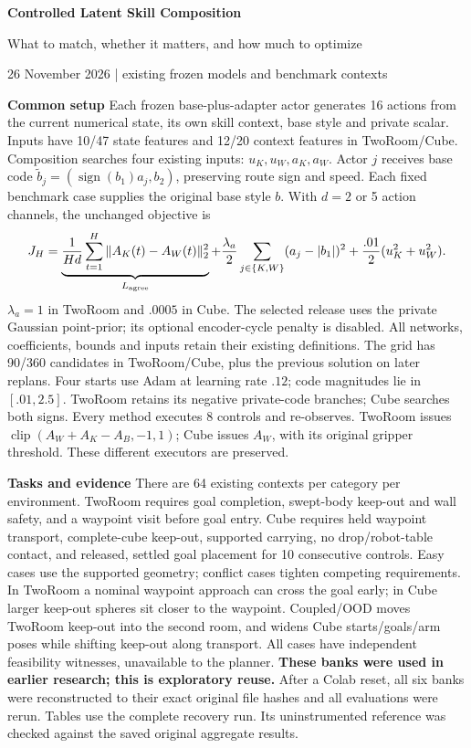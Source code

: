 \documentclass[11pt,a4paper]{article}
\newcommand{\topic}[1]{\par\smallskip\textbf{#1}\quad}
\begin{document}
\fontsize{10}{12}\selectfont
\begin{center}{\LARGE\bfseries\color{ink}Controlled Latent Skill Composition\par}
{\large What to match, whether it matters, and how much to optimize\par}
{\small 26 November 2026 | existing frozen models and benchmark contexts}\end{center}

\topic{Common setup}
Each frozen base-plus-adapter actor generates 16 actions from the current numerical
state, its own skill context, base style and private scalar. Inputs have 10/47
state features and 12/20 context features in TwoRoom/Cube. Composition searches
four existing inputs: $u_K,u_W,a_K,a_W$. Actor $j$ receives base code
$\tilde b_j=(\operatorname{sign}(b_1)a_j,b_2)$, preserving route sign and speed.
Each fixed benchmark case supplies the original base style $b$.
With $d=2$ or 5 action channels, the unchanged objective is
\[
 J_H=\underbrace{\frac1{Hd}\sum_{t=1}^H\|A_K(t)-A_W(t)\|_2^2}_{L_{\rm agree}}
 +\frac{\lambda_a}{2}\sum_{j\in\{K,W\}}(a_j-|b_1|)^2
 +\frac{.01}{2}(u_K^2+u_W^2).
\]
$\lambda_a=1$ in TwoRoom and $.0005$ in Cube. The selected release uses the
private Gaussian point-prior; its optional encoder-cycle penalty is disabled.
All networks, coefficients, bounds and inputs retain their existing definitions.
The grid has 90/360 candidates in TwoRoom/Cube, plus the previous solution on
later replans. Four starts use Adam at learning rate $.12$; code magnitudes lie
in $[.01,2.5]$. TwoRoom retains its negative private-code branches; Cube searches
both signs. Every method executes 8 controls and re-observes. TwoRoom issues
$\operatorname{clip}(A_W+A_K-A_B,-1,1)$; Cube issues $A_W$, with its original
gripper threshold. These different executors are preserved.

\topic{Tasks and evidence}
There are 64 existing contexts per category per environment. TwoRoom requires
goal completion, swept-body keep-out and wall safety, and a waypoint visit before
goal entry. Cube requires held waypoint transport, complete-cube keep-out,
supported carrying, no drop/robot-table contact, and released, settled goal
placement for 10 consecutive controls. Easy cases use the supported geometry;
conflict cases tighten competing requirements. In TwoRoom a nominal waypoint
approach can cross the goal early; in Cube larger keep-out spheres sit closer to
the waypoint. Coupled/OOD moves TwoRoom keep-out into the second room, and widens
Cube starts/goals/arm poses while shifting keep-out along transport. All cases
have independent feasibility witnesses, unavailable to the planner.
\textbf{These banks were used in earlier research; this is exploratory reuse.}
After a Colab reset, all six banks were reconstructed to their exact original
file hashes and all evaluations were rerun. Tables use the complete recovery
run. Its uninstrumented reference was checked against the saved original
aggregate results.
\end{document}
